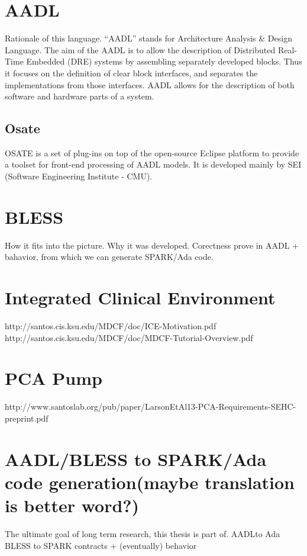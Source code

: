 \section{AADL}
\label{background:aadl}
Rationale of this language.
“AADL” stands for Architecture Analysis \& Design Language. The aim of the AADL is to allow the description of Distributed Real-Time Embedded (DRE) systems by assembling separately developed blocks. Thus it focuses on the definition of clear block interfaces, and separates the implementations from those interfaces. AADL allows for the description of both software and hardware parts of a system. %

\subsection{Osate}
\label{background:aadl:osate}
OSATE is a set of plug-ins on top of the open-source Eclipse platform to provide a toolset for front-end processing of AADL models. It is developed mainly by SEI (Software Engineering Institute - CMU). %


\section{BLESS}
\label{background:bless}
How it fits into the picture. Why it was developed. Corectness prove in AADL + bahavior, from which we can generate SPARK/Ada code.


\section{Integrated Clinical Environment}
\label{background:ice}
http://santos.cis.ksu.edu/MDCF/doc/ICE-Motivation.pdf
http://santos.cis.ksu.edu/MDCF/doc/MDCF-Tutorial-Overview.pdf


\section{PCA Pump}
\label{background:pcapump}
http://www.santoslab.org/pub/paper/LarsonEtAl13-PCA-Requirements-SEHC-preprint.pdf


\section{AADL/BLESS to SPARK/Ada code generation(maybe translation is better word?)}
\label{background:codegen}
The ultimate goal of long term research, this thesis is part of.
AADLto Ada
BLESS to SPARK contracts + (eventually) behavior

